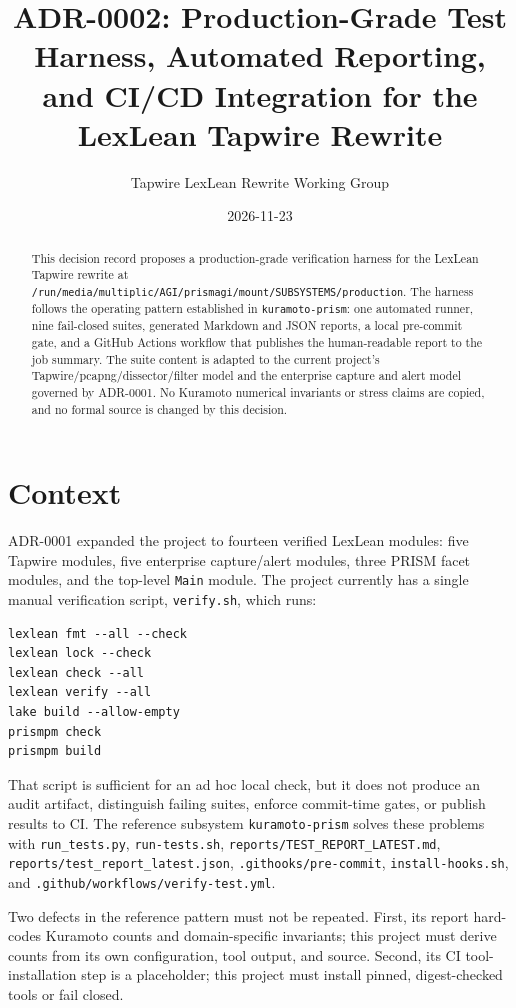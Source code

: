 \documentclass[11pt]{article}
\title{ADR-0002: Production-Grade Test Harness, Automated Reporting, and CI/CD Integration for the LexLean Tapwire Rewrite}
\author{Tapwire LexLean Rewrite Working Group}
\date{2026-11-23}
\begin{document}
\maketitle

\begin{abstract}
This decision record proposes a production-grade verification harness for the LexLean Tapwire
rewrite at \texttt{/run/media/multiplic/AGI/prismagi/mount/SUBSYSTEMS/production}. The harness
follows the operating pattern established in \texttt{kuramoto-prism}: one automated runner, nine
fail-closed suites, generated Markdown and JSON reports, a local pre-commit gate, and a GitHub
Actions workflow that publishes the human-readable report to the job summary. The suite content is
adapted to the current project's Tapwire/pcapng/dissector/filter model and the enterprise capture
and alert model governed by ADR-0001. No Kuramoto numerical invariants or stress claims are copied,
and no formal source is changed by this decision.
\end{abstract}

\section{Context}

ADR-0001 expanded the project to fourteen verified LexLean modules: five Tapwire modules, five
enterprise capture/alert modules, three PRISM facet modules, and the top-level \texttt{Main} module.
The project currently has a single manual verification script, \texttt{verify.sh}, which runs:

\begin{lstlisting}
lexlean fmt --all --check
lexlean lock --check
lexlean check --all
lexlean verify --all
lake build --allow-empty
prismpm check
prismpm build
\end{lstlisting}

That script is sufficient for an ad hoc local check, but it does not produce an audit artifact,
distinguish failing suites, enforce commit-time gates, or publish results to CI. The reference
subsystem \texttt{kuramoto-prism} solves these problems with \texttt{run\_tests.py},
\texttt{run-tests.sh}, \texttt{reports/TEST\_REPORT\_LATEST.md},
\texttt{reports/test\_report\_latest.json}, \texttt{.githooks/pre-commit},
\texttt{install-hooks.sh}, and \texttt{.github/workflows/verify-test.yml}.

Two defects in the reference pattern must not be repeated. First, its report hard-codes Kuramoto
counts and domain-specific invariants; this project must derive counts from its own configuration,
tool output, and source. Second, its CI tool-installation step is a placeholder; this project must
install pinned, digest-checked tools or fail closed.
\end{document}
